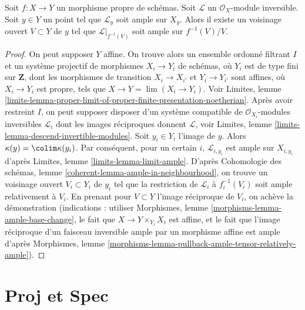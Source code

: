 \begin{lemma}
\label{lemma-ample-in-neighbourhood}
\begin{reference}
\cite[IV Corollaire 9.6.4]{EGA}
\end{reference}
Soit $f : X \to Y$ un morphisme propre de schémas.
Soit $\mathcal{L}$ un $\mathcal{O}_X$-module inversible.
Soit $y \in Y$ un point tel que $\mathcal{L}_y$ soit ample
sur $X_y$. Alors il existe un voisinage ouvert $V \subset Y$
de $y$ tel que $\mathcal{L}|_{f^{-1}(V)}$ soit ample sur $f^{-1}(V)/V$.
\end{lemma}

\begin{proof}
On peut supposer $Y$ affine. On trouve alors un ensemble ordonné filtrant $I$
et un système projectif de morphismes $X_i \to Y_i$ de schémas,
où $Y_i$ est de type fini sur $\mathbf{Z}$, dont les
morphismes de transition $X_i \to X_{i'}$ et $Y_i \to Y_{i'}$ sont affines,
où $X_i \to Y_i$ est propre, tels que $X \to Y = \lim (X_i \to Y_i)$.
Voir Limites, lemme
\ref{limits-lemma-proper-limit-of-proper-finite-presentation-noetherian}.
Après avoir restreint $I$, on peut supposer disposer d'un système compatible de
$\mathcal{O}_{X_i}$-modules inversibles $\mathcal{L}_i$
dont les images réciproques donnent $\mathcal{L}$, voir
Limites, lemme \ref{limits-lemma-descend-invertible-modules}.
Soit $y_i \in Y_i$ l'image de $y$.
Alors $\kappa(y) = \colim \kappa(y_i)$.
Par conséquent, pour un certain $i$, $\mathcal{L}_{i, y_i}$
est ample sur $X_{i, y_i}$ d'après
Limites, lemme \ref{limits-lemma-limit-ample}.
D'après Cohomologie des schémas, lemme \ref{coherent-lemma-ample-in-neighbourhood},
on trouve un voisinage ouvert
$V_i \subset Y_i$ de $y_i$ tel que
la restriction de $\mathcal{L}_i$ à $f_i^{-1}(V_i)$
soit ample relativement à $V_i$.
En prenant pour $V \subset Y$ l'image réciproque de
$V_i$, on achève la démonstration (indications : utiliser
Morphismes, lemme \ref{morphisms-lemma-ample-base-change},
le fait que $X \to Y \times_{Y_i} X_i$ est affine,
et le fait que l'image réciproque d'un
faisceau inversible ample par un morphisme affine est ample d'après
Morphismes, lemme \ref{morphisms-lemma-pullback-ample-tensor-relatively-ample}).
\end{proof}







\section{Proj et Spec}
\label{section-proj-spec}

